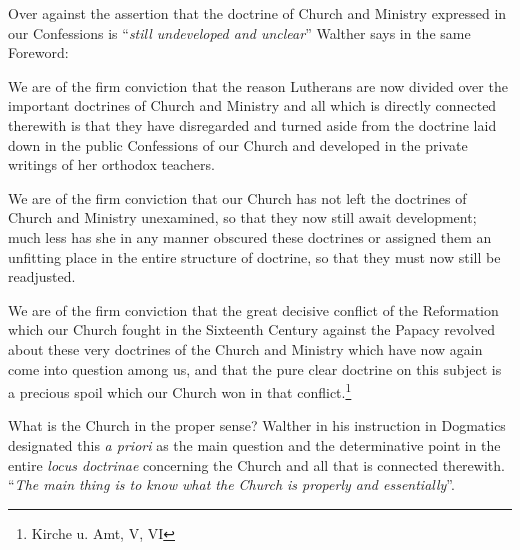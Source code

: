 Over against the assertion that the doctrine of Church and Ministry expressed in our Confessions is “\textit{still undeveloped and unclear}” Walther says in the same Foreword: \begin{fancyquotes} We are of the firm conviction that the reason Lutherans are now divided over the important doctrines of Church and Ministry and all which is directly connected therewith is that they have disregarded and turned aside from the doctrine laid down in the public Confessions of our Church and developed in the private writings of her orthodox teachers.\par  We are of the firm conviction that our Church has not left the doctrines of Church and Ministry unexamined, so that they now still await development; much less has she in any manner obscured these doctrines or assigned them an unfitting place in the entire structure of doctrine, so that they must now still be readjusted. \par We are of the firm conviction that the great decisive conflict of the Reformation which our Church fought in the Sixteenth Century against the Papacy revolved about these very doctrines of the Church and Ministry which have now again come into question among us, and that the pure clear doctrine on this subject is a precious spoil which our Church won in that conflict.\footnote{Kirche u. Amt, V, VI}\end{fancyquotes}
\divider
                What is the Church in the proper sense?  Walther in his instruction in Dogmatics designated this \textit{a priori} as the main question and the determinative point in the entire \textit{locus doctrinae} concerning the Church and all that is connected therewith.  “\textit{The main thing is to know what the Church is properly and essentially}”.

